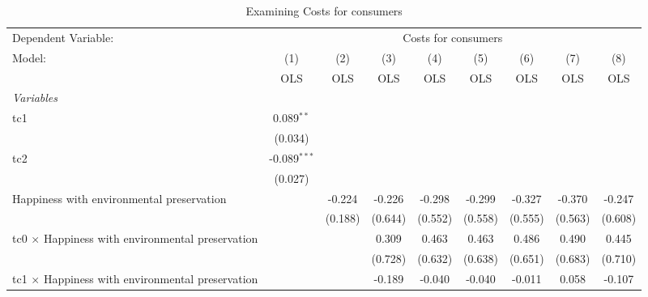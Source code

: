 
\begin{table}[htbp]
   \caption{Examining Costs for consumers}
   \centering
   \begin{tabular}{lcccccccc}
      \toprule
      Dependent Variable: & \multicolumn{8}{c}{Costs for consumers}\\
      Model:                                                  & (1)            & (2)     & (3)     & (4)           & (5)           & (6)           & (7)           & (8)\\  
                                                              &  OLS           & OLS     & OLS     & OLS           & OLS           & OLS           & OLS           & OLS\\  
      \midrule
      \emph{Variables}\\
      tc1                                                     & 0.089$^{**}$   &         &         &               &               &               &               &   \\   
                                                              & (0.034)        &         &         &               &               &               &               &   \\   
      tc2                                                     & -0.089$^{***}$ &         &         &               &               &               &               &   \\   
                                                              & (0.027)        &         &         &               &               &               &               &   \\   
      Happiness with environmental preservation               &                & -0.224  & -0.226  & -0.298        & -0.299        & -0.327        & -0.370        & -0.247\\   
                                                              &                & (0.188) & (0.644) & (0.552)       & (0.558)       & (0.555)       & (0.563)       & (0.608)\\   
      tc0 $\times$ Happiness with environmental preservation  &                &         & 0.309   & 0.463         & 0.463         & 0.486         & 0.490         & 0.445\\   
                                                              &                &         & (0.728) & (0.632)       & (0.638)       & (0.651)       & (0.683)       & (0.710)\\   
      tc1 $\times$ Happiness with environmental preservation  &                &         & -0.189  & -0.040        & -0.040        & -0.011        & 0.058         & -0.107\\   

\end{tabular}
\end{table}
